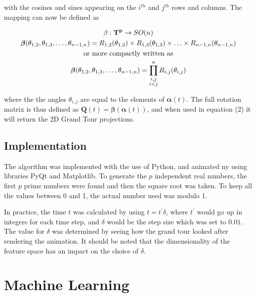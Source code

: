 \documentclass[a4paper,11pt,twoside]{article}
\begin{document}
with the cosines and sines appearing on the $i^{th}$ and $j^{th}$ rows and columns. The mapping can now be defined as

\begin{equation}
\begin{gathered}
\beta: {\bf T^p}
 \rightarrow SO(n)
\\
\bm{\beta}(\theta_{1,2},\theta_{1,3},\dotsc,\theta_{n-1,n})= R_{1,2}(\theta_{1,2}) \times R_{1,3}(\theta_{1,3}) \times \dotsc \times R_{n-1,n}(\theta_{n-1,n})
\\
\text{or more compactly written as}
\\
\bm{\beta}(\theta_{1,2},\theta_{1,3},\dotsc,\theta_{n-1,n})=\prod_{\substack{i,j \\ i<j}}^nR_{i,j}(\theta_{i,j})
\end{gathered}
\end{equation}

where the the angles $\theta_{i,j}$ are equal to the elements of $\bm{\alpha}(t)$. The full rotation matrix is thus defined as $\bm{Q}(t)=\bm{\beta}(\bm{\alpha}(t))$, and when used in equation (2) it will return the 2D Grand Tour projections.

\subsection{Implementation}

The algorithm was implemented with the use of Python, and animated ny using libraries PyQt and Matplotlib. To generate the $p$ independent real numbers, the first $p$ prime numbers were found and then the square root was taken. To keep all the values between 0 and 1, the actual number used was  modulo 1. 
\newline

In practice, the time $t$ was calculated by using $t=t^\prime \delta$, where $t^\prime$ would go up in integers for each time step, and $\delta$ would be the step size which was set to $0.01$. The value for $\delta$ was determined by seeing how the grand tour looked after rendering the animation. It should be noted that the dimensionality of the feature space has an impact on the choice of $\delta$.

\newpage
\section{Machine Learning}
\end{document}
